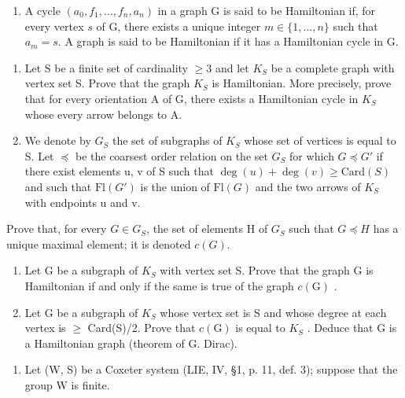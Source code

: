 \begin{enumerate}
\def\labelenumi{\arabic{enumi})}
\setcounter{enumi}{7}
\tightlist
\item
  A cycle \((a_0, f_1, \ldots, f_n, a_n)\) in a graph G is said to be Hamiltonian if, for every vertex \(s\) of G, there exists a unique integer \(m \in \{1, \ldots, n\}\) such that \(a_m = s\). A graph is said to be Hamiltonian if it has a Hamiltonian cycle in G.
\end{enumerate}

\begin{enumerate}
\def\labelenumi{\alph{enumi})}
\item
  Let S be a finite set of cardinality \(\geqslant 3\) and let \(K_{S}\) be a complete graph with vertex set S. Prove that the graph \(K_{S}\) is Hamiltonian. More precisely, prove that for every orientation A of G, there exists a Hamiltonian cycle in \(K_{S}\) whose every arrow belongs to A.
\item
  We denote by \(G_{S}\) the set of subgraphs of \(K_{S}\) whose set of vertices is equal to S. Let \(\preccurlyeq\) be the coarsest order relation on the set \(G_{S}\) for which \(G \preccurlyeq G'\) if there exist elements u, v of S such that \(\deg(u) + \deg(v) \geqslant \text{Card}(S)\) and such that \(\text{Fl}(G')\) is the union of \(\text{Fl}(G)\) and the two arrows of \(K_{S}\) with endpoints u and v.
\end{enumerate}

  Prove that, for every \(G \in G_{S}\), the set of elements H of \(G_{S}\) such that \(G \preccurlyeq H\) has a unique maximal element; it is denoted \(c(G)\).

\begin{enumerate}
\def\labelenumi{\alph{enumi})}
\setcounter{enumi}{2}
\item
  Let G be a subgraph of \(K_{S}\) with vertex set S. Prove that the graph G is Hamiltonian if and only if the same is true of the graph \(c(\mathrm{G})\) .
\item
  Let G be a subgraph of \(K_{S}\) whose vertex set is S and whose degree at each vertex is \(\geqslant\) Card(S)/2. Prove that \(c(\mathrm{G})\) is equal to \(K_{S}\) . Deduce that G is a Hamiltonian graph (theorem of G. Dirac).
\end{enumerate}

\begin{enumerate}
\def\labelenumi{\arabic{enumi})}
\setcounter{enumi}{8}
\tightlist
\item
  Let (W, S) be a Coxeter system (LIE, IV, §1, p. 11, def. 3); suppose that the group W is finite.
\end{enumerate}

